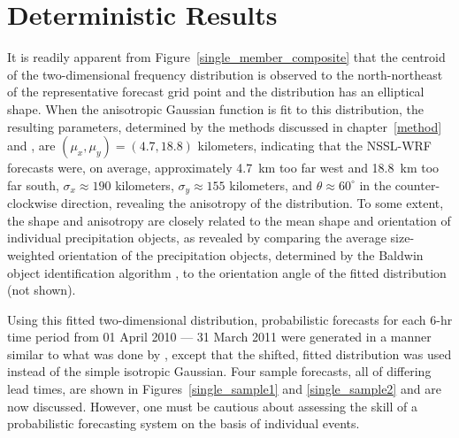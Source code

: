 

\section{Deterministic Results}
\label{dresults}

It is readily apparent from \mbox{Figure \ref{single_member_composite}} that the centroid of the two-dimensional frequency distribution is observed to the north-northeast of the representative forecast grid point and the distribution has an elliptical shape.
When the anisotropic Gaussian function is fit to this distribution, the resulting parameters, determined by the methods discussed in \mbox{chapter \ref{method}} and \cite{Lak2010}, are $(\mu_x, \mu_y) = (4.7, 18.8)$ kilometers, indicating that the NSSL-WRF forecasts were, on average, approximately \mbox{4.7 km} too far west and \mbox{18.8 km} too far south, $\sigma_x \approx 190$ kilometers, $\sigma_y \approx 155$ kilometers, and $\theta \approx 60^{\circ}$ in the counter-clockwise direction, revealing the anisotropy of the distribution.
To some extent, the shape and anisotropy are closely related to the mean shape and orientation of individual precipitation objects, as revealed by comparing the average size-weighted orientation of the precipitation objects, determined by the Baldwin object identification algorithm \citep{Baldwin2005}, to the orientation angle of the fitted distribution (not shown).


Using this fitted two-dimensional distribution, probabilistic forecasts for each \mbox{6-hr} time period from 01 April 2010 --- 31 March 2011 were generated in a manner similar to what was done by \cite{Sobash2011}, except that the shifted, fitted distribution was used instead of the simple isotropic Gaussian.
Four sample forecasts, all of differing lead times, are shown in \mbox{Figures \ref{single_sample1}} and \ref{single_sample2} and are now discussed.
However, one must be cautious about assessing the skill of a probabilistic forecasting system on the basis of individual events.


